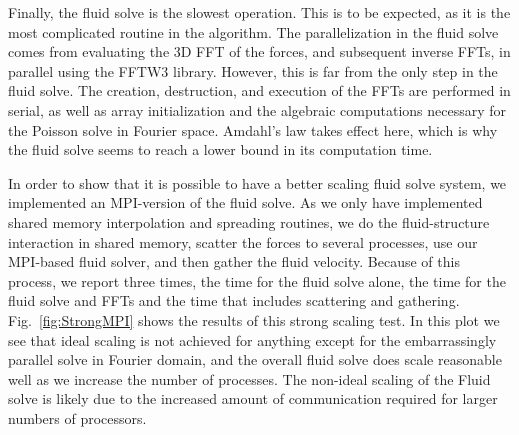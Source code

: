 \documentclass[]{article}
\begin{document}
Finally, the fluid solve is the slowest operation. This is to be expected, as it is the most complicated routine in the algorithm. The parallelization in the fluid solve comes from evaluating the 3D FFT of the forces, and subsequent inverse FFTs, in parallel using the FFTW3 library. However, this is far from the only step in the fluid solve. The creation, destruction, and execution of the FFTs are performed in serial, as well as array initialization and the algebraic computations necessary for the Poisson solve in Fourier space. Amdahl's law takes effect here, which is why the fluid solve seems to reach a lower bound in its computation time. 

In order to show that it is possible to have a better scaling fluid solve system, we implemented an MPI-version of the fluid solve. As we only have implemented shared memory interpolation and spreading routines, we do the fluid-structure interaction in shared memory, scatter the forces to several processes, use our MPI-based fluid solver, and then gather the fluid velocity. Because of this process, we report three times, the time for the fluid solve alone, the time for the fluid solve and FFTs and the time that includes scattering and gathering. Fig.\ \ref{fig:StrongMPI} shows the results of this strong scaling test. In this plot we see that ideal scaling is not achieved for anything except for the embarrassingly parallel solve in Fourier domain, and the overall fluid solve does scale reasonable well as we increase the number of processes. The non-ideal scaling of the Fluid solve is likely due to the increased amount of communication required for larger numbers of processors.
\end{document}

